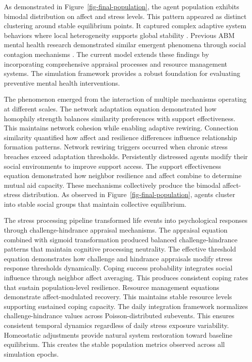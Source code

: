 \documentclass[
  letterpaper,
  DIV=11,
  numbers=noendperiod]{scrartcl}
\begin{document}
As demonstrated in Figure~\ref{fig-final-population}, the agent
population exhibits bimodal distribution on affect and stress levels.
This pattern appeared as distinct clustering around stable equilibrium
points. It captured complex adaptive system behaviors where local
heterogeneity supports global stability \citep{Yan2017}. Previous ABM
mental health research demonstrated similar emergent phenomena through
social contagion mechanisms \citep{Andarlia2021}. The current model
extends these findings by incorporating comprehensive appraisal
processes and resource management systems. The simulation framework
provides a robust foundation for evaluating preventive mental health
interventions.

The phenomenon emerged from the interaction of multiple mechanisms
operating at different scales. The network adaptation equation
demonstrated how homophily strength balances similarity preferences with
support effectiveness. This maintains network cohesion while enabling
adaptive rewiring. Connection similarity quantified how affect and
resilience differences influence relationship formation patterns.
Network rewiring triggers occurred when chronic stress breaches exceed
adaptation thresholds. Persistently distressed agents modify their
social environments to improve support access. The support effectiveness
equation demonstrated how neighbor resilience and affect combine to
determine mutual aid capacity. These mechanisms collectively produce the
bimodal affect-stress distribution. As observed in
Figure~\ref{fig-final-population}, agents cluster into stable social
groups that maintain collective equilibrium.

The stress processing pipeline transformed life events into
psychological responses through challenge-hindrance appraisal
mechanisms. The appraisal equation combined with sigmoid transformation
produced balanced challenge-hindrance patterns that maintain cognitive
processing neutrality. The effective threshold equation demonstrates how
challenge and hindrance appraisals modify stress response thresholds
dynamically. Coping success probability integrates social influence
through neighbor affect averaging. This produces consistent coping rates
that sustain population-level resilience. Resource management equations
demonstrate affect-modulated recovery. This maintains stable resource
levels supporting sustained coping capacity. The daily integration
framework normalizes challenge-hindrance values across
Poisson-distributed subevents. This ensures consistent temporal dynamics
regardless of daily stress exposure variability. Homeostatic adjustments
provide natural system restoration toward baseline equilibrium. This
creates the stable population metrics observed across all simulation
epochs.
\end{document}
